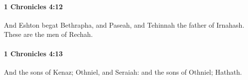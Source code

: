 		\paragraph{1 Chronicles 4:12} %
			\label{1CHRONICLES-4-12}

			And Eshton begat Bethrapha, and Paseah, and Tehinnah the father of Irnahash. These are the men of Rechah.


		\paragraph{1 Chronicles 4:13} %
			\label{1CHRONICLES-4-13}

			And the sons of Kenaz; Othniel, and Seraiah: and the sons of Othniel; Hathath.


